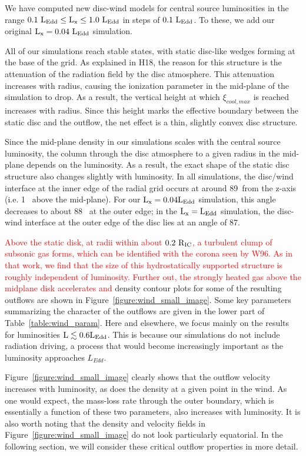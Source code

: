 \documentclass[a4paper,fleqn,usenatbib]{mnras}
\begin{document}
We have computed new disc-wind models for central source luminosities
in the range $\rm{0.1~L_{Edd} \leq L_x \leq 1.0~L_{Edd}}$ in steps of
$\rm{0.1~L_{Edd}}$. To these, we add our original
$\rm{L_x=0.04~L_{Edd}}$ simulation. 

All of our simulations reach stable states, with static disc-like
wedges forming at the base of the grid.
 As explained in H18, the
reason for this structure is the attenuation of the radiation field by the disc
atmosphere. This attenuation increases with radius, causing the
ionization parameter in the mid-plane of the simulation to drop. As a
result, the vertical height at which $\xi_{cool,max}$ is reached
increases with radius. Since this height marks the effective boundary
between the static disc and the outflow, the net effect is a thin,
slightly convex disc structure. 

Since the mid-plane density in our simulations scales with the central
source luminosity, the column through the disc atmosphere to a given
radius in the mid-plane depends on the luminosity. As a result, the
exact shape of the static disc structure also changes slightly with
luminosity. In all simulations, the disc/wind interface at the
inner edge of the radial grid occurs at around 89\degree~from the
z-axis (i.e. 1\degree~ above the mid-plane). For our $\rm{L_x = 0.04L_{Edd}}$ 
simulation, this angle decreases to about 88\degree~ at the outer
edge; in the $\rm{L_x = L_{Edd}}$ simulation, the disc-wind interface at
the outer edge of the disc lies at an angle of 87\degree.

 \textcolor{red}{Above the static disk, at radii within about
   $\rm{0.2~R_{IC}}$, a turbulent clump of subsonic gas forms, 
which can be identified with the corona seen by W96.
As in that work, we find that the size of this hydrostatically supported structure
is roughly independent of luminosity. Further out, the strongly heated gas above 
the midplane disk accelerates and}
density contour plots for some of the resulting outflows are shown in
Figure~\ref{figure:wind_small_image}. Some key parameters summarizing
the character of the outflows are given in the lower part of Table~\ref{table:wind_param}. 
Here and elsewhere, we focus mainly on the
results for luminosities $\rm{L \lesssim 0.6 L_{Edd}}$. This is
because our simulations do not include radiation driving, a process
that would become increasingly important as the luminosity approaches $L_{Edd}$. 

Figure~\ref{figure:wind_small_image} clearly shows that the outflow
velocity increases with luminosity, as does the density at a given
point in the wind. As one would expect, the mass-loss rate through the
outer boundary, which is essentially a function of these two
parameters, also increases with luminosity. It is also worth noting
that the density and velocity fields in
Figure~\ref{figure:wind_small_image} do not look particularly 
equatorial. In the following section, we
will consider these critical outflow properties in more detail.
\end{document}
